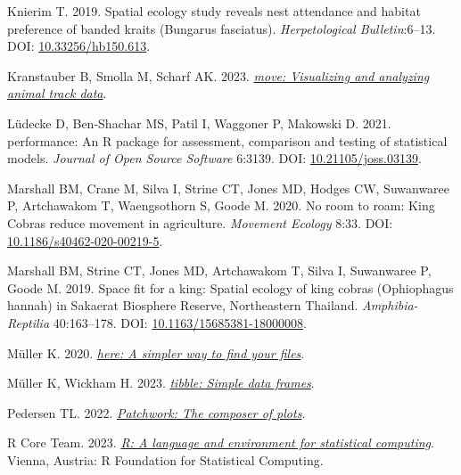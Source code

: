 \documentclass[10pt,a4paper]{article}
\newlength{\cslhangindent}
\newlength{\cslentryspacingunit} %
\newenvironment{CSLReferences}[2] %
 {%
  \setlength{\parindent}{0pt}
  \ifodd #1
  \let\oldpar\par
  \def\par{\hangindent=\cslhangindent\oldpar}
  \fi
  \setlength{\parskip}{#2\cslentryspacingunit}
 }%
 {}
\begin{document}
\begin{CSLReferences}{1}{0}
\leavevmode{}%
Knierim T. 2019. Spatial ecology study reveals nest attendance and habitat preference of banded kraits ({Bungarus} fasciatus). \emph{Herpetological Bulletin}:6--13. DOI: \href{https://doi.org/10.33256/hb150.613}{10.33256/hb150.613}.

\leavevmode{}%
Kranstauber B, Smolla M, Scharf AK. 2023. \emph{\href{https://CRAN.R-project.org/package=move}{{move}: Visualizing and analyzing animal track data}}.

\leavevmode{}%
Lüdecke D, Ben-Shachar MS, Patil I, Waggoner P, Makowski D. 2021. {performance}: An {R} package for assessment, comparison and testing of statistical models. \emph{Journal of Open Source Software} 6:3139. DOI: \href{https://doi.org/10.21105/joss.03139}{10.21105/joss.03139}.

\leavevmode{}%
Marshall BM, Crane M, Silva I, Strine CT, Jones MD, Hodges CW, Suwanwaree P, Artchawakom T, Waengsothorn S, Goode M. 2020. No room to roam: {King} {Cobras} reduce movement in agriculture. \emph{Movement Ecology} 8:33. DOI: \href{https://doi.org/10.1186/s40462-020-00219-5}{10.1186/s40462-020-00219-5}.

\leavevmode{}%
Marshall BM, Strine CT, Jones MD, Artchawakom T, Silva I, Suwanwaree P, Goode M. 2019. Space fit for a king: Spatial ecology of king cobras ({Ophiophagus} hannah) in {Sakaerat} {Biosphere} {Reserve}, {Northeastern} {Thailand}. \emph{Amphibia-Reptilia} 40:163--178. DOI: \href{https://doi.org/10.1163/15685381-18000008}{10.1163/15685381-18000008}.

\leavevmode{}%
Müller K. 2020. \emph{\href{https://CRAN.R-project.org/package=here}{{here}: A simpler way to find your files}}.

\leavevmode{}%
Müller K, Wickham H. 2023. \emph{\href{https://CRAN.R-project.org/package=tibble}{{tibble}: Simple data frames}}.

\leavevmode{}%
Pedersen TL. 2022. \emph{\href{https://CRAN.R-project.org/package=patchwork}{Patchwork: The composer of plots}}.

\leavevmode{}%
R Core Team. 2023. \emph{\href{https://www.R-project.org/}{R: A language and environment for statistical computing}}. Vienna, Austria: R Foundation for Statistical Computing.


\end{CSLReferences}
\end{document}
